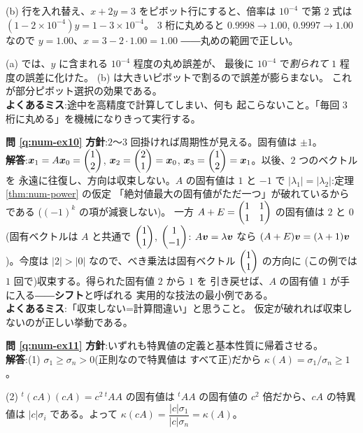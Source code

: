 (b) 行を入れ替え、$x + 2y = 3$ をピボット行にすると、倍率は
$10^{-4}$ で第 $2$ 式は $(1 - 2 \times 10^{-4})y = 1 - 3 \times 10^{-4}$。
$3$ 桁に丸めると $0.9998 \to 1.00$, $0.9997 \to 1.00$ なので
$y = 1.00$、$x = 3 - 2 \cdot 1.00 = 1.00$
――丸めの範囲で正しい。

(a) では、$y$ に含まれる $10^{-4}$ 程度の丸め誤差が、
最後に $10^{-4}$ で\emph{割られて} $1$ 程度の誤差に化けた。
(b) は大きいピボットで割るので誤差が膨らまない。
これが部分ピボット選択の効果である。\\
\textbf{よくあるミス}:途中を高精度で計算してしまい、何も
起こらないこと。「毎回 $3$ 桁に丸める」を機械になりきって実行する。

\bigskip
\noindent\textbf{問 \ref{q:num-ex10}}\quad
\textbf{方針}:$2$〜$3$ 回掛ければ周期性が見える。固有値は $\pm 1$。\\
\textbf{解答}:$\bm{x}_1 = A\bm{x}_0 = \begin{pmatrix}1 \\ 2\end{pmatrix}$,
$\bm{x}_2 = \begin{pmatrix}2 \\ 1\end{pmatrix} = \bm{x}_0$,
$\bm{x}_3 = \begin{pmatrix}1 \\ 2\end{pmatrix} = \bm{x}_1$。以後、$2$ つのベクトルを
永遠に往復し、方向は収束しない。$A$ の固有値は $1$ と $-1$ で
$|\lambda_1| = |\lambda_2|$:定理 \ref{thm:num-power} の仮定
「絶対値最大の固有値がただ一つ」が破れているからである
($(-1)^k$ の項が減衰しない)。
一方 $A + E = \begin{pmatrix}1 & 1 \\ 1 & 1\end{pmatrix}$ の固有値は $2$ と $0$
(固有ベクトルは $A$ と共通で $\begin{pmatrix}1 \\ 1\end{pmatrix}$, $\begin{pmatrix}1 \\ -1\end{pmatrix}$:
$A\bm{v} = \lambda\bm{v}$ なら
$(A + E)\bm{v} = (\lambda + 1)\bm{v}$)。今度は
$|2| > |0|$ なので、べき乗法は固有ベクトル $\begin{pmatrix}1 \\ 1\end{pmatrix}$ の方向に
(この例では $1$ 回で)収束する。得られた固有値 $2$ から $1$ を
引き戻せば、$A$ の固有値 $1$ が手に入る――\textbf{シフト}と呼ばれる
実用的な技法の最小例である。\\
\textbf{よくあるミス}:「収束しない=計算間違い」と思うこと。
仮定が破れれば収束しないのが正しい挙動である。

\bigskip
\noindent\textbf{問 \ref{q:num-ex11}}\quad
\textbf{方針}:いずれも特異値の定義と基本性質に帰着させる。\\
\textbf{解答}:(1) $\sigma_1 \ge \sigma_n > 0$(正則なので特異値は
すべて正)だから $\kappa(A) = \sigma_1/\sigma_n \ge 1$。

(2) ${}^t(cA)(cA) = c^2\,{}^tAA$ の固有値は ${}^tAA$ の固有値の
$c^2$ 倍だから、$cA$ の特異値は $|c|\sigma_i$ である。よって
$\kappa(cA) = \dfrac{|c|\sigma_1}{|c|\sigma_n} = \kappa(A)$。

